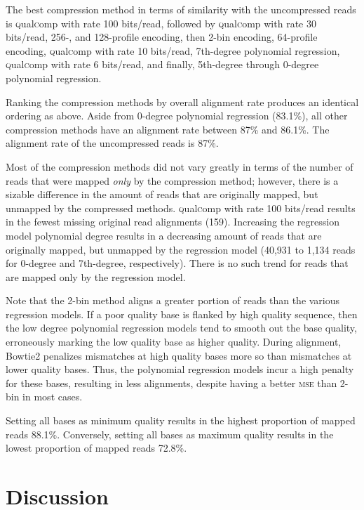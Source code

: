 \documentclass{bioinfo}
\begin{document}
The best compression method in terms of similarity with the
uncompressed reads is \textsc{q}ual\textsc{c}omp with rate 100
bits/read, followed by \textsc{q}ual\textsc{c}omp with rate 30
bits/read, 256-, and 128-profile encoding, then 2-bin encoding,
64-profile encoding, \textsc{q}ual\textsc{c}omp with rate 10
bits/read, 7th-degree polynomial regression,
\textsc{q}ual\textsc{c}omp with rate 6 bits/read, and finally,
5th-degree through 0-degree polynomial regression.

Ranking the compression methods by overall alignment rate produces an
identical ordering as above. Aside from 0-degree polynomial regression
(83.1\%), all other compression methods have an alignment rate between
87\% and 86.1\%. The alignment rate of the uncompressed reads is 87\%.

Most of the compression methods did not vary greatly in terms of the
number of reads that were mapped \emph{only} by the compression
method; however, there is a sizable difference in the amount of reads
that are originally mapped, but unmapped by the compressed methods.
\textsc{q}ual\textsc{c}omp with rate 100 bits/read results in the
fewest missing original read alignments (159). Increasing the
regression model polynomial degree results in a decreasing amount of
reads that are originally mapped, but unmapped by the regression model
(40,931 to 1,134 reads for 0-degree and 7th-degree,
respectively). There is no such trend for reads that are mapped only
by the regression model.

Note that the 2-bin method aligns a greater portion of reads than the
various regression models. If a poor quality base is flanked by high
quality sequence, then the low degree polynomial regression models
tend to smooth out the base quality, erroneously marking the low
quality base as higher quality.  During alignment, Bowtie2 penalizes
mismatches at high quality bases more so than mismatches at lower
quality bases. Thus, the polynomial regression models incur a high
penalty for these bases, resulting in less alignments, despite having
a better \textsc{mse} than 2-bin in most cases.

Setting all bases as minimum quality results in the highest proportion
of mapped reads 88.1\%. Conversely, setting all bases as maximum
quality results in the lowest proportion of mapped reads 72.8\%.

\section{Discussion}
\end{document}
